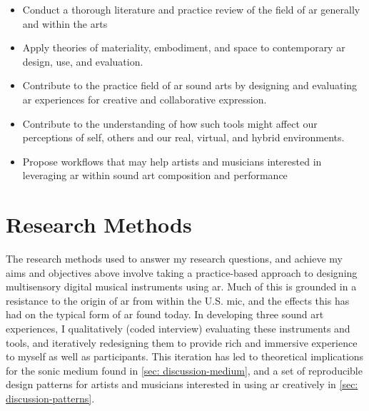 \begin{itemize}
    \item Conduct a thorough literature and practice review of the field of \gls{ar} generally and within the arts
    \item Apply theories of materiality, embodiment, and space to contemporary \gls{ar} design, use, and evaluation.
    \item Contribute to the practice field of \gls{ar} sound arts by designing and evaluating \gls{ar} experiences for creative and collaborative expression.
    \item Contribute to the understanding of how such tools might affect our perceptions of self, others and our real, virtual, and hybrid environments. 
    \item Propose workflows that may help artists and musicians interested in leveraging \gls{ar} within sound art composition and performance
\end{itemize}



\section{Research Methods}\label{sec: introduction-methods}
The research methods used to answer my research questions, and achieve my aims and objectives above involve taking a practice-based approach to designing multisensory digital musical instruments using \gls{ar}. Much of this is grounded in a resistance to the origin of \gls{ar} from within the U.S. \gls{mic}, and the effects this has had on the typical form of \gls{ar} found today. In developing three sound \gls{art} experiences, I qualitatively (coded interview) evaluating these instruments and tools, and iteratively redesigning them to provide rich and immersive experience to myself as well as participants. This iteration has led to theoretical implications for the sonic medium found in \autoref{sec: discussion-medium}, and a set of reproducible design patterns for artists and musicians interested in using \gls{ar} creatively in \autoref{sec: discussion-patterns}.




